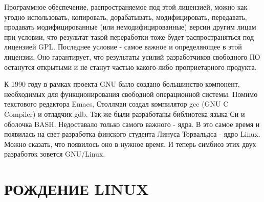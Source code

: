 \documentclass[bachelor, och, referat, times]{SCWorks}
\begin{document}
\par Программное обеспечение, распространяемое под 
этой лицензией, можно 
как угодно использовать, копировать, дорабатывать, 
модифицировать, 
передавать, продавать модифицированные (или 
немодифицированные) версии 
другим лицам при условии, что результат такой 
переработки тоже будет 
распространяться под лицензией GPL. Последнее 
условие - самое важное и 
определяющее в этой лицензии. Оно гарантирует, что 
результаты усилий 
разработчиков свободного ПО останутся открытыми и 
не станут частью 
какого-либо проприетарного продукта.

\par К 1990 году в рамках проекта GNU было создано 
большинство компонент, 
необходимых для функционирования свободной 
операционной системы. Помимо 
текстового редактора Emacs, Столлман создал 
компилятор gcc (GNU C 
Compiler) и отладчик gdb. Так-же были разработаны 
библиотека языка Си и 
оболочка BASH. Недоставало только самого важного - 
ядра. В это самое время
и появилась на свет разработка финского студента 
Линуса Торвальдса - ядро 
Linux. Можно сказать, что появилось оно в нужное 
время. И теперь симбиоз 
этих двух разработок зовется GNU/Linux.

\section{РОЖДЕНИЕ LINUX}
\end{document}
